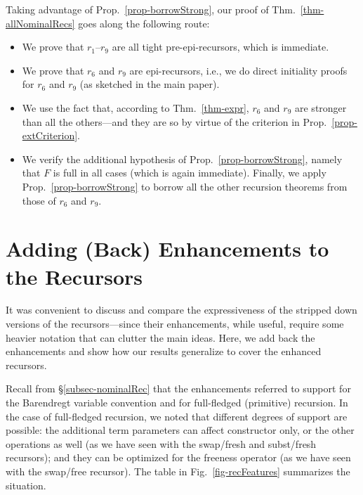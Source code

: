 Taking advantage of Prop.~\ref{prop-borrowStrong}, our proof of Thm.~\ref{thm-allNominalRecs} goes along the following route:
\begin{itemize}
	\item We prove that $r_1$--$r_9$ are all tight pre-epi-recursors, which is immediate. 
	\item We prove that $r_6$ and $r_9$
	are epi-recursors, i.e., we do direct initiality proofs for $r_6$ and $r_9$ (as sketched in the main paper). 
	\item We use the fact that, according to Thm.~\ref{thm-expr}, $r_6$ and $r_9$ are stronger than all the others---and they are so by virtue of the criterion in Prop.~\ref{prop-extCriterion}. %
	\item We verify the additional hypothesis of Prop.~\ref{prop-borrowStrong}, namely that $F$ is full in all cases (which is again immediate).  Finally, we apply Prop.~\ref{prop-borrowStrong} to borrow all the other recursion theorems from those of $r_6$ and $r_9$. 
\end{itemize}
%



\section{Adding (Back) Enhancements to the Recursors} 
\label{app-addingBacknhancements}


It was convenient to discuss and compare the expressiveness of the stripped down versions of the recursors---since their enhancements, while useful, require some heavier notation that can clutter the main ideas.  Here, we add back the enhancements and 
show how our results generalize to cover the enhanced recursors. 

Recall from \S\ref{subsec-nominalRec} that the enhancements referred to support for the Barendregt variable convention and for full-fledged (primitive) recursion. 
%
In the case of full-fledged recursion, we noted that different degrees of support are possible: the additional term parameters  can affect constructor only, or the other operations as well (as we have seen with the swap/fresh and subst/fresh recursors); and they can be optimized for the freeness operator (as we have seen with the swap/free recursor).  
The table in Fig.~\ref{fig-recFeatures} summarizes the situation. 

